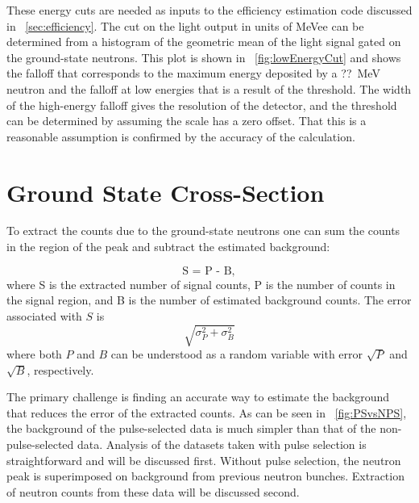 These energy cuts are needed as inputs to the efficiency estimation code discussed in {\sect}~\ref{sec:efficiency}.  The cut on the light output in units of MeVee can be determined from a histogram of the geometric mean of the light signal gated on the ground-state neutrons.  This plot is shown in {\fig}~\ref{fig:lowEnergyCut} and shows the falloff that corresponds to the maximum energy deposited by a ??~MeV neutron and the falloff at low energies that is a result of the threshold.  The width of the high-energy falloff gives the resolution of the detector, and the threshold can be determined by assuming the scale has a zero offset.  That this is a reasonable assumption is confirmed by the accuracy of the calculation.  

\section{Ground State Cross-Section}

To extract the counts due to the ground-state neutrons one can sum the counts in the region of the peak and subtract the estimated background:

\begin{equation}
\text{S = P - B},
\label{eq:counts}
\end{equation}
where S is the extracted number of signal counts, P is the number of counts in the signal region, and B is the number of estimated background counts.  The error associated with $S$ is
\begin{equation}
\sqrt{\sigma_{P}^2 + \sigma_{B}^2}
\label{eq:errDef}
\end{equation}
where both $P$ and $B$ can be understood as a random variable with error $\sqrt{P}$ and $\sqrt{B}$, respectively.

The primary challenge is finding an accurate way to estimate the background that reduces the error of the extracted counts.  As can be seen in {\fig}~\ref{fig:PSvsNPS}, the background of the pulse-selected data is much simpler than that of the non-pulse-selected data.  Analysis of the datasets taken with pulse selection is straightforward and will be discussed first.  Without pulse selection, the neutron peak is superimposed on background from previous neutron bunches.  Extraction of neutron counts from these data will be discussed second.

